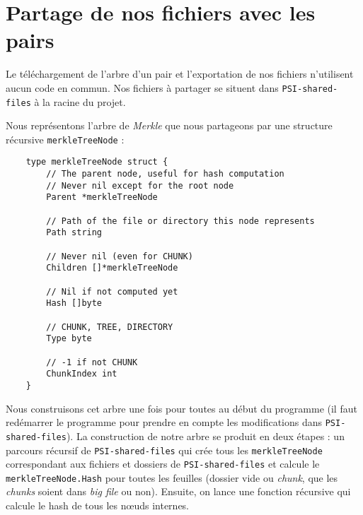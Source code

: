 \section{Partage de nos fichiers avec les pairs}
Le téléchargement de l'arbre d'un pair et l'exportation de nos fichiers n'utilisent aucun code en commun.
Nos fichiers à partager se situent dans \texttt{PSI-shared-files} à la racine du projet.

Nous représentons l'arbre de \textit{Merkle} que nous partageons par une structure récursive \texttt{merkleTreeNode} :
\begin{verbatim}
    type merkleTreeNode struct {
        // The parent node, useful for hash computation
        // Never nil except for the root node
        Parent *merkleTreeNode

        // Path of the file or directory this node represents
        Path string

        // Never nil (even for CHUNK)
        Children []*merkleTreeNode

        // Nil if not computed yet
        Hash []byte

        // CHUNK, TREE, DIRECTORY
        Type byte

        // -1 if not CHUNK
        ChunkIndex int
    }
\end{verbatim}

Nous construisons cet arbre une fois pour toutes au début du programme (il faut redémarrer le programme pour prendre en compte les modifications dans \texttt{PSI-shared-files}). La construction de notre arbre se produit en deux étapes : un parcours récursif de \texttt{PSI-shared-files} qui crée tous les \texttt{merkleTreeNode} correspondant aux fichiers et dossiers de \texttt{PSI-shared-files} et calcule le \texttt{merkleTreeNode.Hash} pour toutes les feuilles (dossier vide ou \textit{chunk}, que les \textit{chunks} soient dans \textit{big file} ou non). Ensuite, on lance une fonction récursive qui calcule le hash de tous les nœuds internes.

